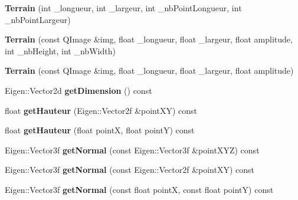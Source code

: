 \begin{DoxyCompactItemize}
\item 
\hypertarget{class_terrain_a6bf1f6d2e6752a8867fe8b52c91db77d}{}{\bfseries Terrain} (int \+\_\+longueur, int \+\_\+largeur, int \+\_\+nb\+Point\+Longueur, int \+\_\+nb\+Point\+Largeur)\label{class_terrain_a6bf1f6d2e6752a8867fe8b52c91db77d}

\item 
\hypertarget{class_terrain_ab9f85e6709f43730861ea8ca1495fb55}{}{\bfseries Terrain} (const Q\+Image \&img, float \+\_\+longueur, float \+\_\+largeur, float amplitude, int \+\_\+nb\+Height, int \+\_\+nb\+Width)\label{class_terrain_ab9f85e6709f43730861ea8ca1495fb55}

\item 
\hypertarget{class_terrain_a0a3617d1538960c5a2ae931b1526477d}{}{\bfseries Terrain} (const Q\+Image \&img, float \+\_\+longueur, float \+\_\+largeur, float amplitude)\label{class_terrain_a0a3617d1538960c5a2ae931b1526477d}

\item 
\hypertarget{class_terrain_a3db2cee7d4dd6d4d0354a4d477c5553a}{}Eigen\+::\+Vector2d {\bfseries get\+Dimension} () const \label{class_terrain_a3db2cee7d4dd6d4d0354a4d477c5553a}

\item 
\hypertarget{class_terrain_a077639383b5c1508fc72a19f240ecb57}{}float {\bfseries get\+Hauteur} (Eigen\+::\+Vector2f \&point\+X\+Y) const \label{class_terrain_a077639383b5c1508fc72a19f240ecb57}

\item 
\hypertarget{class_terrain_adeacbd7d55d73c94969dc6703851419d}{}float {\bfseries get\+Hauteur} (float point\+X, float point\+Y) const \label{class_terrain_adeacbd7d55d73c94969dc6703851419d}

\item 
\hypertarget{class_terrain_a29853b6388338a50eb86c04449819c25}{}Eigen\+::\+Vector3f {\bfseries get\+Normal} (const Eigen\+::\+Vector3f \&point\+X\+Y\+Z) const \label{class_terrain_a29853b6388338a50eb86c04449819c25}

\item 
\hypertarget{class_terrain_a2d13dfd8da78f4835f1251a6c04f42da}{}Eigen\+::\+Vector3f {\bfseries get\+Normal} (const Eigen\+::\+Vector2f \&point\+X\+Y) const \label{class_terrain_a2d13dfd8da78f4835f1251a6c04f42da}

\item 
\hypertarget{class_terrain_af22f0e6f25679561f2d64098202abe0c}{}Eigen\+::\+Vector3f {\bfseries get\+Normal} (const float point\+X, const float point\+Y) const \label{class_terrain_af22f0e6f25679561f2d64098202abe0c}


\end{DoxyCompactItemize}
